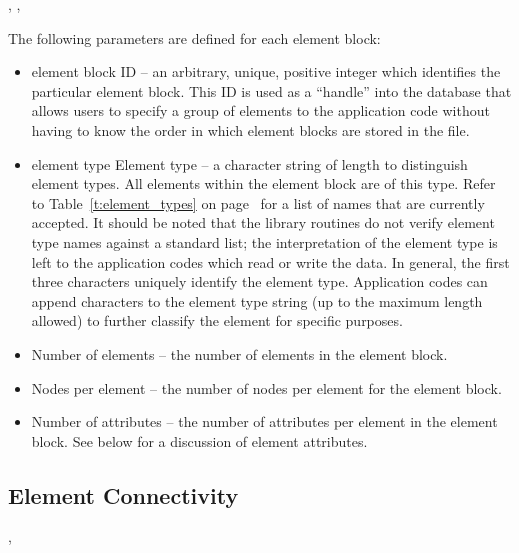 \begin{spacing}{1.5}
\api {}, , 
\end{spacing}

The following parameters are defined for each element block:

\begin{itemize}
 \item element block ID -- an arbitrary, unique, positive integer
 which identifies the particular element block. This ID is used as a
 ``handle'' into the database that allows users to specify a group of
 elements to the application code without having to know the order in
 which element blocks are stored in the file.

 \item element type Element type -- a character string of length
  to distinguish element types. All elements
 within the element block are of this type. Refer to
 Table~\ref{t:element_types} on page~\pageref{t:element_types} for a
 list of names that are currently accepted. It should be noted that
 the \exo{} library routines do not verify element type names against
 a standard list; the interpretation of the element type is left to
 the application codes which read or write the data. In general, the
 first three characters uniquely identify the element
 type. Application codes can append characters to the element type
 string (up to the maximum length allowed) to further classify the
 element for specific purposes.

 \item {Number of elements -- the number of elements in the 
element block.}

 \item {Nodes per element -- the number of nodes per element 
for the element block.}

 \item {Number of attributes -- the number of attributes per element
 in the element block. See below for a discussion of element
 attributes.}
\end{itemize}



\subsection{Element Connectivity}

\begin{spacing}{1.5}
\api {}, 
\end{spacing}

